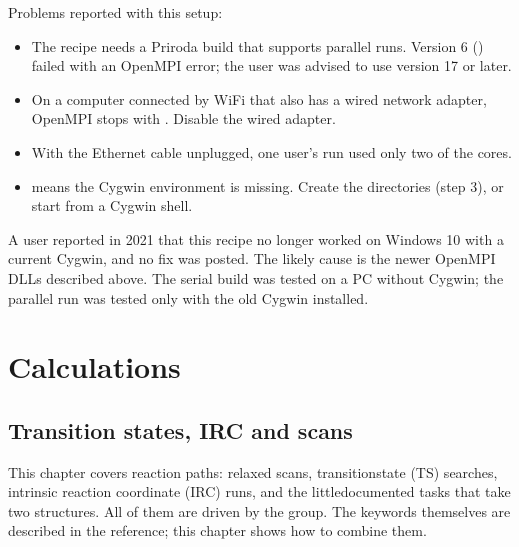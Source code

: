 \documentclass[letterpaper,10pt,english,openany,oneside]{sphinxmanual}
\begin{document}
\sphinxAtStartPar
Problems reported with this setup:
\begin{itemize}
\item {} 
\sphinxAtStartPar
The recipe needs a Priroda build that supports parallel runs. Version 6 () failed with an OpenMPI
 error; the user was advised to use version 17 or later. 

\item {} 
\sphinxAtStartPar
On a computer connected by Wi\sphinxhyphen{}Fi that also has a wired network adapter, OpenMPI stops with
. Disable the wired
adapter. 

\item {} 
\sphinxAtStartPar
With the Ethernet cable unplugged, one user’s run used only two of the cores. 

\item {} 
\sphinxAtStartPar
{} means the Cygwin environment is missing. Create the
 directories (step 3), or start from a Cygwin shell. 

\end{itemize}

\sphinxAtStartPar
A user reported in 2021 that this recipe no longer worked on Windows 10 with a current Cygwin, and no fix was posted.
The likely cause is the newer OpenMPI DLLs described above. The serial build was tested on a PC without Cygwin;
the parallel run was tested only with the old Cygwin installed.



\part{Calculations}

\sphinxstepscope


\chapter{Transition states, IRC and scans}
\label{\detokenize{tasks/ts-irc-scan:transition-states-irc-and-scans}}\label{\detokenize{tasks/ts-irc-scan:tasks-ts-irc-scan}}\label{\detokenize{tasks/ts-irc-scan::doc}}
\sphinxAtStartPar
This chapter covers reaction paths: relaxed scans, transition\sphinxhyphen{}state (TS) searches, intrinsic reaction coordinate
(IRC) runs, and the little\sphinxhyphen{}documented tasks that take two structures. All of them are driven by the
{\hyperref[\detokenize{reference/optimize:group-optimize}]{}} group. The keywords themselves are described in the reference; this chapter shows
how to combine them.
\end{document}
